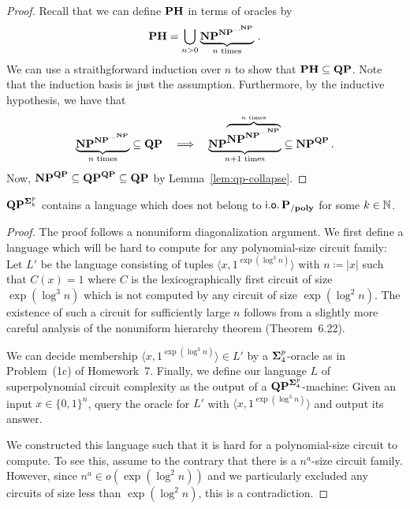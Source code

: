 \documentclass[11pt]{article}
\begin{document}
\begin{proof}
  Recall that we can define $\mathbf{PH}$ in terms of oracles by
  \[
    \mathbf{PH} =
    \bigcup_{n > 0} \underbrace{\mathbf{NP}^{\mathbf{NP}^{\cdots^{\mathbf{NP}}}}}_{n \textrm{ times}}
    \,.
  \]
  We can use a straithgforward induction over $n$ to show that
  $\mathbf{PH} \subseteq \mathbf{QP}$.
  Note that the induction basis is just the assumption.
  Furthermore, by the inductive hypothesis, we have that
  \[
    \underbrace{\mathbf{NP}^{\mathbf{NP}^{\cdots^{\mathbf{NP}}}}}_{n \textrm{ times}}
    \subseteq
    \mathbf{QP}
    \quad
    \Longrightarrow
    \quad
    \underbrace{\mathbf{NP}^{\overbrace{
      \mathbf{NP}^{\mathbf{NP}^{\cdots^{\mathbf{NP}}}}
    }^{n \textrm{ times}}}}_{n+1 \textrm{ times}}
    \subseteq
    \mathbf{NP}^{\mathbf{QP}} \,.
  \]
  Now, $\mathbf{NP}^{\mathbf{QP}} \subseteq \mathbf{QP}^{\mathbf{QP}} \subseteq \mathbf{QP} $
  by Lemma~\ref{lem:qp-collapse}.
\end{proof}

\begin{lemma}
	\label{lem:qp-super-circ}
	$\mathbf{QP}^{\mathbf{\Sigma}^p_k}$ contains a language which does not belong
	to $\mathsf{i.o.}\, \mathbf{P_{/poly}}$ for some $k \in {\mathbb{N}}$.
\end{lemma}

\begin{proof}
	The proof follows a nonuniform diagonalization argument. We first define
	a language which will be hard to compute for any polynomial-size circuit
	family:
	Let $L'$ be the language consisting of tuples
	$\langle x, 1^{\exp(\log^3 n)} \rangle$
	with $n \coloneqq |x|$
	such that $C(x) = 1$ where $C$ is the
	lexicographically first circuit of size $\exp(\log^3 n)$ which is not
	computed by any circuit of size $\exp(\log^2 n)$.
	The existence of such a circuit for sufficiently large $n$ follows from a
	slightly more careful analysis of the nonuniform hierarchy theorem
	(Theorem~6.22).
	
	We can decide membership $\langle x, 1^{\exp(\log^3 n)} \rangle \in L'$
	by a $\mathbf{\Sigma}^p_4$-oracle as in Problem~(1c) of Homework~7.
	Finally, we define our language $L$ of superpolynomial circuit complexity
	as the output of a $\mathbf{QP}^{\mathbf{\Sigma}^p_4}$-machine: Given an input
	$x \in \{0,1\}^n$, query the oracle for $L'$ with
	$\langle x, 1^{\exp(\log^3 n)} \rangle$ and output its answer.
	
	We constructed this language such that it is hard for a polynomial-size
	circuit to compute. To see this, assume to the contrary that there is
	a $n^a$-size circuit family.
	However, since $n^a \in o(\exp(\log^2 n))$ and we particularly excluded any
	circuits of size less than $\exp(\log^2 n)$, this is a contradiction.
\end{proof}
\end{document}
